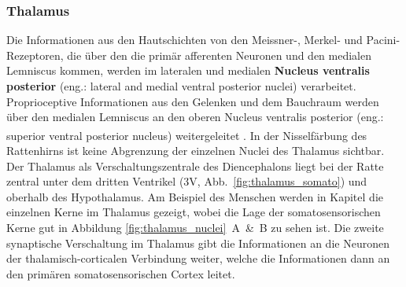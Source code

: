 \documentclass[12pt,a4paper,pdftex]{article}
\begin{document}
\subsubsection*{Thalamus}
Die Informationen aus den Hautschichten von den Meissner-, Merkel- und Pacini-Rezeptoren, die über den die primär afferenten Neuronen und den medialen Lemniscus kommen, werden im lateralen und medialen \textbf{Nucleus ventralis posterior} (eng.: lateral and medial
ventral posterior nuclei)  verarbeitet. Proprioceptive Informationen aus den Gelenken und dem Bauchraum werden über den medialen Lemniscus an den oberen Nucleus ventralis posterior (eng.: superior ventral posterior nucleus) weitergeleitet \textsuperscript{\cite[22]{kandel2013principles}}. 
In der Nisselfärbung des Rattenhirns ist keine Abgrenzung der einzelnen Nuclei des Thalamus sichtbar. Der Thalamus als Verschaltungszentrale des Diencephalons liegt bei der Ratte zentral unter dem dritten Ventrikel (3V, Abb.~\ref{fig:thalamus_somato}) und oberhalb des Hypothalamus. 
Am Beispiel des Menschen werden in Kapitel \label{subsubsec:thalamus} die einzelnen Kerne im Thalamus gezeigt, wobei die Lage der somatosensorischen Kerne gut in Abbildung \ref{fig:thalamus_nuclei}~A~\&~B zu sehen ist.
Die zweite synaptische Verschaltung im Thalamus gibt die Informationen an die Neuronen der thalamisch-corticalen Verbindung weiter, welche die Informationen dann an den primären somatosensorischen Cortex leitet.
\end{document}
